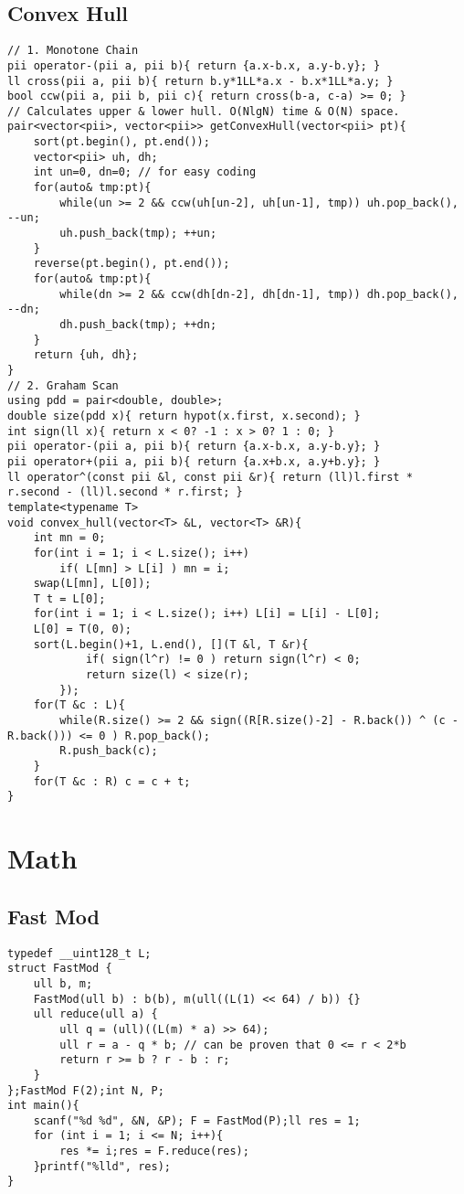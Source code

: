 \documentclass[landscape, 8pt, a4paper, oneside, twocolumn]{extarticle}
\begin{document}
\subsection{Convex Hull}
\begin{verbatim}
// 1. Monotone Chain
pii operator-(pii a, pii b){ return {a.x-b.x, a.y-b.y}; }
ll cross(pii a, pii b){ return b.y*1LL*a.x - b.x*1LL*a.y; }
bool ccw(pii a, pii b, pii c){ return cross(b-a, c-a) >= 0; }
// Calculates upper & lower hull. O(NlgN) time & O(N) space.
pair<vector<pii>, vector<pii>> getConvexHull(vector<pii> pt){
    sort(pt.begin(), pt.end());
    vector<pii> uh, dh;
    int un=0, dn=0; // for easy coding
    for(auto& tmp:pt){
        while(un >= 2 && ccw(uh[un-2], uh[un-1], tmp)) uh.pop_back(), --un;
        uh.push_back(tmp); ++un;
    }
    reverse(pt.begin(), pt.end());
    for(auto& tmp:pt){
        while(dn >= 2 && ccw(dh[dn-2], dh[dn-1], tmp)) dh.pop_back(), --dn;
        dh.push_back(tmp); ++dn;
    }
    return {uh, dh};
}
// 2. Graham Scan
using pdd = pair<double, double>;
double size(pdd x){ return hypot(x.first, x.second); }
int sign(ll x){ return x < 0? -1 : x > 0? 1 : 0; }
pii operator-(pii a, pii b){ return {a.x-b.x, a.y-b.y}; }
pii operator+(pii a, pii b){ return {a.x+b.x, a.y+b.y}; }
ll operator^(const pii &l, const pii &r){ return (ll)l.first * r.second - (ll)l.second * r.first; }
template<typename T>
void convex_hull(vector<T> &L, vector<T> &R){
    int mn = 0;
    for(int i = 1; i < L.size(); i++)
        if( L[mn] > L[i] ) mn = i;
    swap(L[mn], L[0]);
    T t = L[0];
    for(int i = 1; i < L.size(); i++) L[i] = L[i] - L[0];
    L[0] = T(0, 0);
    sort(L.begin()+1, L.end(), [](T &l, T &r){
            if( sign(l^r) != 0 ) return sign(l^r) < 0;
            return size(l) < size(r);
        });
    for(T &c : L){
        while(R.size() >= 2 && sign((R[R.size()-2] - R.back()) ^ (c - R.back())) <= 0 ) R.pop_back();
        R.push_back(c);
    }
    for(T &c : R) c = c + t;
}
\end{verbatim}
\section{Math}
\subsection{Fast Mod}
\begin{verbatim}
typedef __uint128_t L;
struct FastMod {
    ull b, m;
    FastMod(ull b) : b(b), m(ull((L(1) << 64) / b)) {}
    ull reduce(ull a) {
        ull q = (ull)((L(m) * a) >> 64);
        ull r = a - q * b; // can be proven that 0 <= r < 2*b
        return r >= b ? r - b : r;
    }
};FastMod F(2);int N, P;
int main(){
    scanf("%d %d", &N, &P); F = FastMod(P);ll res = 1;
    for (int i = 1; i <= N; i++){
        res *= i;res = F.reduce(res);
    }printf("%lld", res);
}
\end{verbatim}
\end{document}

